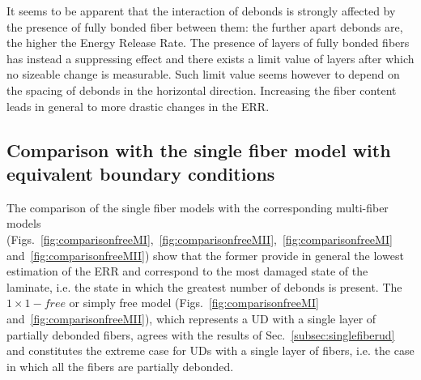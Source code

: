 \documentclass[review]{elsarticle}
\begin{document}
It seems to be apparent that the interaction of debonds is strongly affected by the presence of fully bonded fiber between them: the further apart debonds are, the higher the Energy Release Rate. The presence of layers of fully bonded fibers has instead a suppressing effect and there exists a limit value of layers after which no sizeable change is measurable. Such limit value seems however to depend on the spacing of debonds in the horizontal direction. Increasing the fiber content leads in general to more drastic changes in the ERR.

\subsection{Comparison with the single fiber model with equivalent boundary conditions}

The comparison of the single fiber models with the corresponding multi-fiber models (Figs.~\ref{fig:comparisonfreeMI},~\ref{fig:comparisonfreeMII},~\ref{fig:comparisonfreeMI} and~\ref{fig:comparisonfreeMII}) show that the former provide in general the lowest estimation of the ERR and correspond to the most damaged state of the laminate, i.e. the state in which the greatest number of debonds is present. The $1\times 1-free$ or simply free model (Figs.~\ref{fig:comparisonfreeMI} and~\ref{fig:comparisonfreeMII}), which represents a UD with a single layer of partially debonded fibers, agrees with the results of Sec.~\ref{subsec:singlefiberud} and constitutes the extreme case for UDs with a single layer of fibers, i.e. the case in which all the fibers are partially debonded.
\end{document}
